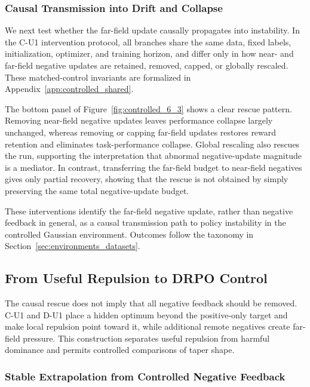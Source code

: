\subsubsection{Causal Transmission into Drift and Collapse}
\label{sec:controlled_transmission}

We next test whether the far-field update causally propagates into
instability. In the C-U1 intervention protocol, all branches share the
same data, fixed labels, initialization, optimizer, and training horizon,
and differ only in how near- and far-field negative updates are retained,
removed, capped, or globally rescaled. These matched-control invariants are
formalized in Appendix~\ref{app:controlled_shared}.

The bottom panel of Figure~\ref{fig:controlled_6_3} shows a clear rescue
pattern. Removing near-field negative updates leaves performance collapse
largely unchanged, whereas removing or capping far-field updates restores
reward retention and eliminates task-performance collapse. Global
rescaling also rescues the run, supporting the interpretation that
abnormal negative-update magnitude is a mediator. In contrast,
transferring the far-field budget to near-field negatives gives only
partial recovery, showing that the rescue is not obtained by simply
preserving the same total negative-update budget.

These interventions identify the far-field negative update, rather than
negative feedback in general, as a causal transmission path to policy
instability in the controlled Gaussian environment. Outcomes follow the
taxonomy in Section~\ref{sec:environments_datasets}.

\subsection{From Useful Repulsion to DRPO Control}
\label{sec:repulsion_control}

The causal rescue does not imply that all negative feedback should be removed.
C-U1 and D-U1 place a hidden optimum beyond the positive-only target and make
local repulsion point toward it, while additional remote negatives create
far-field pressure. This construction separates useful repulsion from harmful
dominance and permits controlled comparisons of taper shape.

\subsubsection{Stable Extrapolation from Controlled Negative Feedback}
\label{sec:controlled_negative_strength}

